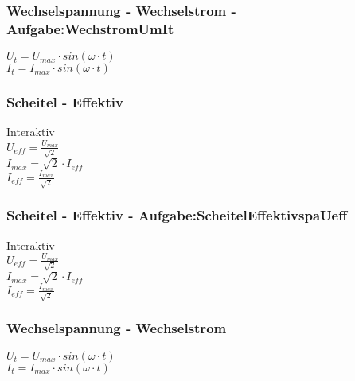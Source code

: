 \subsubsection{Wechselspannung - Wechselstrom - Aufgabe:WechstromUmIt} 
\begin{minipage}{0.45\textwidth} 
$ U_{t}  = U_{max} \cdot sin(\omega \cdot t) $\\ 
$ I_{t}  = I_{max} \cdot sin(\omega \cdot t) $\\ 
\end{minipage} 
\begin{minipage}{0.45\textwidth} 
 
\end{minipage} 
\subsubsection{Scheitel - Effektiv} 
\begin{minipage}{0.45\textwidth} 
Interaktiv\\ 
$ U_{eff}  = \frac{U_{max} }{\sqrt{2}} $\\ 
$ I_{max}  = \sqrt{2}\cdot I_{eff} $\\ 
$ I_{eff}  = \frac{I_{max} }{\sqrt{2}} $\\ 
\end{minipage} 
\begin{minipage}{0.45\textwidth} 
 
\end{minipage} 
\subsubsection{Scheitel - Effektiv  - Aufgabe:ScheitelEffektivspaUeff} 
\begin{minipage}{0.45\textwidth} 
Interaktiv\\ 
$ U_{eff}  = \frac{U_{max} }{\sqrt{2}} $\\ 
$ I_{max}  = \sqrt{2}\cdot I_{eff} $\\ 
$ I_{eff}  = \frac{I_{max} }{\sqrt{2}} $\\ 
\end{minipage} 
\begin{minipage}{0.45\textwidth} 
 
\end{minipage} 
\subsubsection{Wechselspannung - Wechselstrom} 
\begin{minipage}{0.45\textwidth} 
$ U_{t}  = U_{max} \cdot sin(\omega \cdot t) $\\ 
$ I_{t}  = I_{max} \cdot sin(\omega \cdot t) $\\ 
\end{minipage} 
\begin{minipage}{0.45\textwidth} 
 
\end{minipage} 
